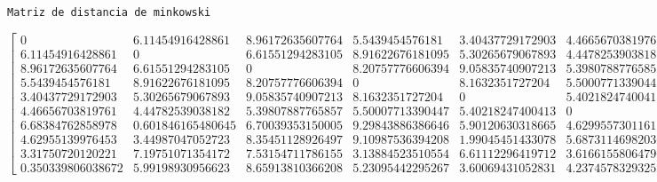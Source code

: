 \documentclass[11pt]{article}
\begin{document}
    \begin{Verbatim}[commandchars=\\\{\}]
                         Matriz de distancia de minkowski
    \end{Verbatim}

    $\displaystyle \left[\begin{matrix}0 & 6.11454916428861 & 8.96172635607764 & 5.5439454576181 & 3.40437729172903 & 4.46656703819761 & 6.68384762858978 & 4.62955139976453 & 3.31750720120221 & 0.350339806038672\\6.11454916428861 & 0 & 6.61551294283105 & 8.91622676181095 & 5.30265679067893 & 4.44782539038182 & 0.601846165480645 & 3.44987047052723 & 7.19751071354172 & 5.99198930956623\\8.96172635607764 & 6.61551294283105 & 0 & 8.20757776606394 & 9.05835740907213 & 5.39807887765857 & 6.70039353150005 & 8.35451128926497 & 7.53154711786155 & 8.65913810366208\\5.5439454576181 & 8.91622676181095 & 8.20757776606394 & 0 & 8.1632351727204 & 5.50007713390447 & 9.29843886386646 & 9.10987536394208 & 3.13884523510554 & 5.23095442295267\\3.40437729172903 & 5.30265679067893 & 9.05835740907213 & 8.1632351727204 & 0 & 5.40218247400413 & 5.90120630318665 & 1.99045451433078 & 6.61112296419712 & 3.60069431052831\\4.46656703819761 & 4.44782539038182 & 5.39807887765857 & 5.50007713390447 & 5.40218247400413 & 0 & 4.62995573011611 & 5.68731146982036 & 3.61661558064796 & 4.23745783293259\\6.68384762858978 & 0.601846165480645 & 6.70039353150005 & 9.29843886386646 & 5.90120630318665 & 4.62995573011611 & 0 & 4.02770351913122 & 7.56130493603761 & 6.55245911199444\\4.62955139976453 & 3.44987047052723 & 8.35451128926497 & 9.10987536394208 & 1.99045451433078 & 5.68731146982036 & 4.02770351913122 & 0 & 7.61874412977636 & 4.76236483015256\\3.31750720120221 & 7.19751071354172 & 7.53154711786155 & 3.13884523510554 & 6.61112296419712 & 3.61661558064796 & 7.56130493603761 & 7.61874412977636 & 0 & 3.06676249438003\\0.350339806038672 & 5.99198930956623 & 8.65913810366208 & 5.23095442295267 & 3.60069431052831 & 4.23745783293259 & 6.55245911199444 & 4.76236483015256 & 3.06676249438003 & 0\end{matrix}\right]$
\end{document}
